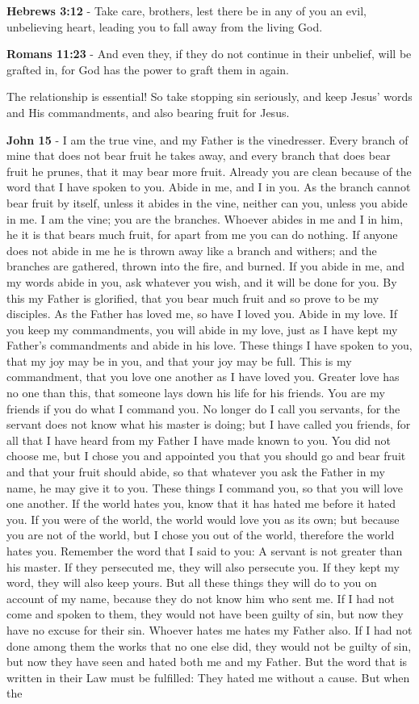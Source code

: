 \documentclass[11pt]{article}
\begin{document}
\textbf{Hebrews 3:12} - Take care, brothers, lest there be in any of you an evil, unbelieving heart, leading you to fall away from the living God.

\textbf{Romans 11:23} - And even they, if they do not continue in their unbelief, will be grafted in, for God has the power to graft them in again.

The relationship is essential!
So take stopping sin seriously, and keep Jesus' words and His commandments, and also bearing fruit for Jesus.

\textbf{John 15} - I am the true vine, and my Father is the vinedresser. Every branch of mine that does not bear fruit he takes away, and every branch that does bear fruit he prunes, that it may bear more fruit. Already you are clean because of the word that I have spoken to you. Abide in me, and I in you. As the branch cannot bear fruit by itself, unless it abides in the vine, neither can you, unless you abide in me. I am the vine; you are the branches. Whoever abides in me and I in him, he it is that bears much fruit, for apart from me you can do nothing. If anyone does not abide in me he is thrown away like a branch and withers; and the branches are gathered, thrown into the fire, and burned. If you abide in me, and my words abide in you, ask whatever you wish, and it will be done for you. By this my Father is glorified, that you bear much fruit and so prove to be my disciples. As the Father has loved me, so have I loved you. Abide in my love. If you keep my commandments, you will abide in my love, just as I have kept my Father's commandments and abide in his love. These things I have spoken to you, that my joy may be in you, and that your joy may be full. This is my commandment, that you love one another as I have loved you. Greater love has no one than this, that someone lays down his life for his friends. You are my friends if you do what I command you. No longer do I call you servants, for the servant does not know what his master is doing; but I have called you friends, for all that I have heard from my Father I have made known to you. You did not choose me, but I chose you and appointed you that you should go and bear fruit and that your fruit should abide, so that whatever you ask the Father in my name, he may give it to you. These things I command you, so that you will love one another. If the world hates you, know that it has hated me before it hated you. If you were of the world, the world would love you as its own; but because you are not of the world, but I chose you out of the world, therefore the world hates you. Remember the word that I said to you: A servant is not greater than his master. If they persecuted me, they will also persecute you. If they kept my word, they will also keep yours. But all these things they will do to you on account of my name, because they do not know him who sent me. If I had not come and spoken to them, they would not have been guilty of sin, but now they have no excuse for their sin. Whoever hates me hates my Father also. If I had not done among them the works that no one else did, they would not be guilty of sin, but now they have seen and hated both me and my Father. But the word that is written in their Law must be fulfilled: They hated me without a cause. But when the 
\end{document}

